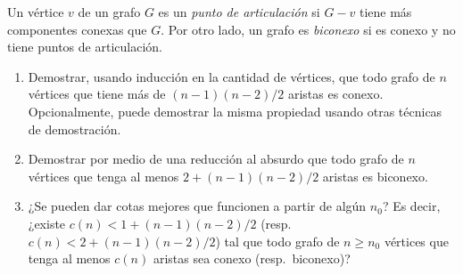 


\item Un vértice $v$ de un grafo $G$ es un \emph{punto de articulación} si $G-v$ tiene más componentes conexas que $G$. Por otro lado, un grafo es \emph{biconexo} si es conexo y no tiene puntos de articulación.

 \begin{enumerate}[label=$\alph*)$,ref=$\alph*)$]
    \item\Obligatorio Demostrar, usando inducción en la cantidad de vértices, que todo grafo de $n$ vértices que tiene más de $(n-1)(n-2)/2$ aristas es conexo. Opcionalmente, puede demostrar la misma propiedad usando otras técnicas de demostración.

    \item Demostrar por medio de una reducción al absurdo que todo grafo de $n$ vértices que tenga al menos $2+(n-1)(n-2)/2$ aristas es biconexo.

    \item ¿Se pueden dar cotas mejores que funcionen a partir de algún $n_0$? Es decir, ¿existe $c(n) < 1+(n-1)(n-2)/2$ (resp.\ $c(n) < 2+(n-1)(n-2)/2$) tal que todo grafo de $n \geq n_0$ vértices que tenga al menos $c(n)$ aristas sea conexo (resp.\ biconexo)?
 \end{enumerate}

